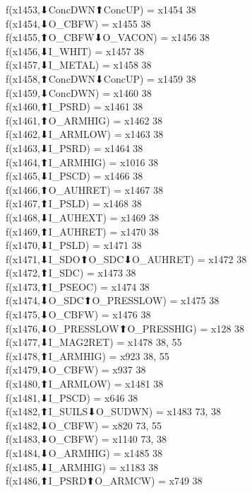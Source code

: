 f(x1453,⬇ConcDWN⬆ConcUP) = x1454 {38} \\
f(x1454,⬇O_CBFW) = x1455 {38} \\
f(x1455,⬆O_CBFW⬇O_VACON) = x1456 {38} \\
f(x1456,⬇I_WHIT) = x1457 {38} \\
f(x1457,⬇I_METAL) = x1458 {38} \\
f(x1458,⬆ConcDWN⬇ConcUP) = x1459 {38} \\
f(x1459,⬇ConcDWN) = x1460 {38} \\
f(x1460,⬆I_PSRD) = x1461 {38} \\
f(x1461,⬆O_ARMHIG) = x1462 {38} \\
f(x1462,⬇I_ARMLOW) = x1463 {38} \\
f(x1463,⬇I_PSRD) = x1464 {38} \\
f(x1464,⬆I_ARMHIG) = x1016 {38} \\
f(x1465,⬇I_PSCD) = x1466 {38} \\
f(x1466,⬆O_AUHRET) = x1467 {38} \\
f(x1467,⬆I_PSLD) = x1468 {38} \\
f(x1468,⬇I_AUHEXT) = x1469 {38} \\
f(x1469,⬆I_AUHRET) = x1470 {38} \\
f(x1470,⬇I_PSLD) = x1471 {38} \\
f(x1471,⬇I_SDO⬆O_SDC⬇O_AUHRET) = x1472 {38} \\
f(x1472,⬆I_SDC) = x1473 {38} \\
f(x1473,⬆I_PSEOC) = x1474 {38} \\
f(x1474,⬇O_SDC⬆O_PRESSLOW) = x1475 {38} \\
f(x1475,⬇O_CBFW) = x1476 {38} \\
f(x1476,⬇O_PRESSLOW⬆O_PRESSHIG) = x128 {38} \\
f(x1477,⬇I_MAG2RET) = x1478 {38, 55} \\
f(x1478,⬆I_ARMHIG) = x923 {38, 55} \\
f(x1479,⬇O_CBFW) = x937 {38} \\
f(x1480,⬆I_ARMLOW) = x1481 {38} \\
f(x1481,⬇I_PSCD) = x646 {38} \\
f(x1482,⬆I_SUILS⬇O_SUDWN) = x1483 {73, 38} \\
f(x1482,⬇O_CBFW) = x820 {73, 55} \\
f(x1483,⬇O_CBFW) = x1140 {73, 38} \\
f(x1484,⬇O_ARMHIG) = x1485 {38} \\
f(x1485,⬇I_ARMHIG) = x1183 {38} \\
f(x1486,⬆I_PSRD⬆O_ARMCW) = x749 {38} \\

